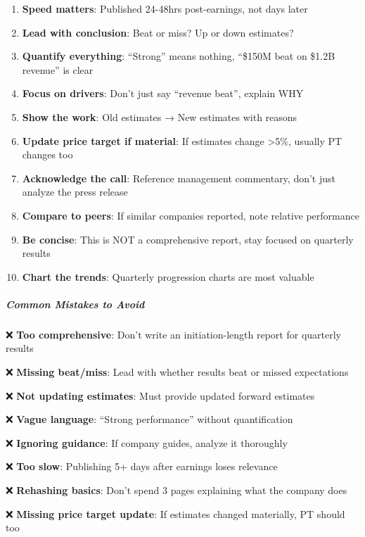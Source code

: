 \documentclass[11pt]{article}
\begin{document}
\begin{enumerate}[leftmargin=*,itemsep=2pt,topsep=2pt]
\item {} \textbf{Speed matters}: Published 24-48hrs post-earnings, not days later
\item {} \textbf{Lead with conclusion}: Beat or miss? Up or down estimates?
\item {} \textbf{Quantify everything}: ``Strong'' means nothing, ``\$150M beat on \$1.2B revenue'' is clear
\item {} \textbf{Focus on drivers}: Don't just say ``revenue beat'', explain WHY
\item {} \textbf{Show the work}: Old estimates → New estimates with reasons
\item {} \textbf{Update price target if material}: If estimates change >5\%, usually PT changes too
\item {} \textbf{Acknowledge the call}: Reference management commentary, don't just analyze the press release
\item {} \textbf{Compare to peers}: If similar companies reported, note relative performance
\item {} \textbf{Be concise}: This is NOT a comprehensive report, stay focused on quarterly results
\item {} \textbf{Chart the trends}: Quarterly progression charts are most valuable
\end{enumerate}

\subparagraph{Common Mistakes to Avoid}\mbox{}\par

❌ \textbf{Too comprehensive}: Don't write an initiation-length report for quarterly results


❌ \textbf{Missing beat/miss}: Lead with whether results beat or missed expectations


❌ \textbf{Not updating estimates}: Must provide updated forward estimates


❌ \textbf{Vague language}: ``Strong performance'' without quantification


❌ \textbf{Ignoring guidance}: If company guides, analyze it thoroughly


❌ \textbf{Too slow}: Publishing 5+ days after earnings loses relevance


❌ \textbf{Rehashing basics}: Don't spend 3 pages explaining what the company does


❌ \textbf{Missing price target update}: If estimates changed materially, PT should too
\end{document}
